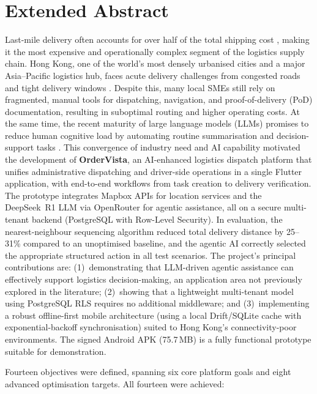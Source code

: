 \chapter*{Extended Abstract}

Last-mile delivery often accounts for over half of the total shipping cost
\autocite{fedex2025lastmile}, making it the most expensive and operationally
complex segment of the logistics supply chain.  Hong Kong, one of the world's
most densely urbanised cities and a major Asia--Pacific logistics
hub, faces acute delivery challenges from congested roads and tight delivery
windows \autocite{tlb2025logistics,fedex2025lastmile}.  Despite this, many
local SMEs still rely on fragmented, manual tools for dispatching, navigation,
and proof-of-delivery (PoD) documentation, resulting in suboptimal routing and
higher operating costs.  At the same time, the recent maturity of large
language models (LLMs) promises to reduce human cognitive load by automating
routine summarisation and decision-support tasks
\autocite{brynjolfsson2023generative}.  This convergence of industry need and
AI capability motivated the development of \textbf{OrderVista}, an AI-enhanced
logistics dispatch platform that unifies administrative dispatching and
driver-side operations in a single Flutter application, with end-to-end
workflows from task creation to delivery verification.  The prototype
integrates Mapbox APIs for location services and the DeepSeek~R1 LLM via
OpenRouter for agentic assistance, all on a secure multi-tenant backend
(PostgreSQL with Row-Level Security).  In evaluation, the nearest-neighbour
sequencing algorithm reduced total delivery distance by 25--31\% compared to
an unoptimised baseline, and the agentic AI correctly selected the appropriate
structured action in all test scenarios.  The project's principal contributions
are: (1)~demonstrating that LLM-driven agentic assistance can effectively
support logistics decision-making, an application area not previously explored
in the literature; (2)~showing that a lightweight multi-tenant model using
PostgreSQL RLS requires no additional middleware; and (3)~implementing a robust
offline-first mobile architecture (using a local Drift/SQLite cache with
exponential-backoff synchronisation) suited to Hong Kong's connectivity-poor
environments.  The signed Android APK (75.7\,MB) is a fully functional
prototype suitable for demonstration.

Fourteen objectives were defined, spanning six core platform goals and eight
advanced optimisation targets.  All fourteen were achieved:

